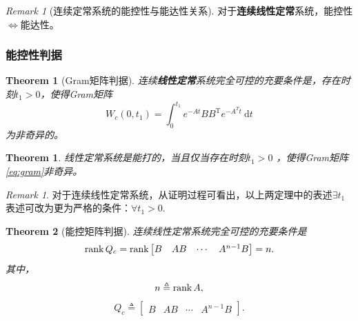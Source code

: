 \documentclass[14pt,a4paper]{article}
\theoremstyle{plain}
\newtheorem{thm}{Theorem}[section]
\newtheorem*{nnt}{Theorem}
\theoremstyle{definition}
\theoremstyle{remark}
\newtheorem{rmk}{Remark}[section]
\newtheorem*{nnr}{Remark}
\theoremstyle{plain}
\theoremstyle{plain}
\theoremstyle{plain}
\theoremstyle{definition}
\theoremstyle{remark}
\numberwithin{equation}{section}
\begin{document}
			\begin{rmk}[连续定常系统的能控性与能达性关系]  
			\label{rmk:能控性与能达性关系}
				对于\textbf{连续线性定常}系统，能控性$\Leftrightarrow$能达性。
			\end{rmk} 

			\subsubsection{能控性判据}%
			\label{ssub:能控性判据}
			
				\begin{thm}[Gram矩阵判据]  
				\label{the:gram矩阵判据}
					连续\textbf{线性定常}系统完全可控的\emph{充要条件}是，存在时刻$t_1>0$，使得Gram矩阵
					\begin{equation}
					\label{eq:gram}
					W_c(0,t_1) = \int_0^{t_1} e^{-At}BB^{\text{T}}e^{-A^{T}t}\ \mathrm{d}t	
					\end{equation} 
					为非奇异的。
				\end{thm}

				\begin{nnt} 
					线性定常系统是能打的，当且仅当存在时刻$t_1>0$ ，使得Gram矩阵\eqref{eq:gram}非奇异。
				\end{nnt} 

				\begin{nnr}  
					对于连续线性定常系统，从证明过程可看出，以上两定理中的表述$\exists t_1$ 表述可改为更为严格的条件：$\forall t_1>0$. 
				\end{nnr} 


				\begin{thm}[能控矩阵判据]  
				\label{the:能控矩阵判据}
					连续线性定常系统完全可控的\emph{充要条件}是
					\begin{equation}
					\label{eq:Qc}
						\mathop{\textnormal{rank}} Q_c = \mathop{\textnormal{rank}} \begin{bmatrix}
							B & AB & \cdots & A^{n-1}B
						\end{bmatrix} = n
					.\end{equation}
					其中，
					\[
					n \triangleq \mathop{\textnormal{rank}} A 
					,\] 
					\[
					Q_c \triangleq 
						 \begin{bmatrix}
							B & AB & \cdots & A^{n-1}B
						\end{bmatrix} 
					.\] 
				\end{thm} 
\end{document}
